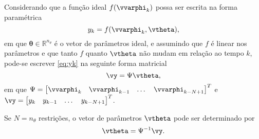 Considerando que a função ideal $f(\vvarphi_{k})$ possa ser escrita na forma paramétrica 
\begin{equation}
    y_k = f(\vvarphi_{k},\vtheta),
   \label{eq:yk}
\end{equation}
em que $\bm{\theta} \in \mathbb{R}^{n_\theta}$  é o vetor de parâmetros ideal, 
%
e assumindo que $f$ é linear nos parâmetros e que tanto $f$ quanto $\vtheta$ não mudam em relação ao tempo $k$, pode-se escrever \eqref{eq:yk} na seguinte forma matricial
\begin{equation}
\label{eq:yMatrix}
   \vy = \Psi\vtheta,
\end{equation}
em que $\Psi = \begin{bmatrix} \vvarphi_{k} & \vvarphi_{k-1} & \dots & \vvarphi_ {k-N+1} \end{bmatrix}^T$ e $\vy = \begin{bmatrix} y_k & y_{k-1} & \dots & y_{k-N+1} \end{bmatrix}^T$.


Se $N=n_\theta$ restrições, o vetor de parâmetros $\vtheta$ pode ser determinado por
\begin{equation}
   \vtheta = \Psi^{-1}\vy
\label{eq:thetaest}.
\end{equation}

